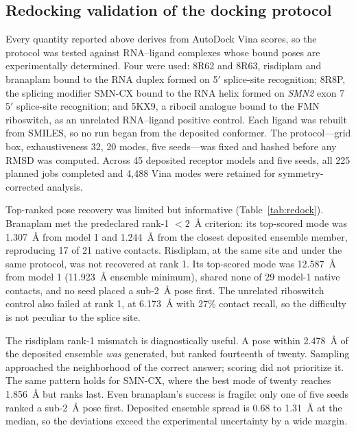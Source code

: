 \documentclass[journal]{IEEEtran}
\begin{document}
\subsection{Redocking validation of the docking protocol}
\label{sec:res-redock}

Every quantity reported above derives from AutoDock Vina scores, so the
protocol was tested against RNA--ligand complexes whose bound poses are
experimentally determined. Four were used: 8R62 and 8R63, risdiplam and
branaplam bound to the RNA duplex formed on 5$'$ splice-site
recognition; 8R8P, the splicing modifier SMN-CX bound to the RNA helix
formed on \textit{SMN2} exon 7 5$'$ splice-site recognition; and 5KX9,
a ribocil analogue bound to the FMN riboswitch, as an unrelated
RNA--ligand positive control. Each ligand was rebuilt from SMILES, so
no run began from the deposited conformer. The protocol---grid box,
exhaustiveness 32, 20 modes, five seeds---was fixed and hashed before
any RMSD was computed. Across 45 deposited receptor models and five
seeds, all 225 planned jobs completed and 4{,}488 Vina modes were
retained for symmetry-corrected analysis.

Top-ranked pose recovery was limited but informative
(Table~\ref{tab:redock}). Branaplam met the predeclared rank-1
$<2$~\AA{} criterion: its top-scored mode was 1.307~\AA{} from model 1
and 1.244~\AA{} from the closest deposited ensemble member, reproducing
17 of 21 native contacts. Risdiplam, at the same site and under the same
protocol, was not recovered at rank 1. Its top-scored mode was
12.587~\AA{} from model 1 (11.923~\AA{} ensemble minimum), shared none
of 29 model-1 native contacts, and no seed placed a sub-2~\AA{} pose
first. The unrelated riboswitch control also failed at rank 1, at
6.173~\AA{} with 27\% contact recall, so the difficulty is not peculiar
to the splice site.

The risdiplam rank-1 mismatch is diagnostically useful.
A pose within 2.478~\AA{} of the deposited ensemble \emph{was}
generated, but ranked fourteenth of twenty. Sampling approached the
neighborhood of the correct answer; scoring did not prioritize it. The
same pattern holds for SMN-CX, where the best mode of twenty reaches
1.856~\AA{} but ranks last. Even branaplam's success is fragile: only
one of five seeds ranked a sub-2~\AA{} pose first. Deposited ensemble
spread is 0.68 to 1.31~\AA{} at the median, so the deviations exceed the
experimental uncertainty by a wide margin.
\end{document}
